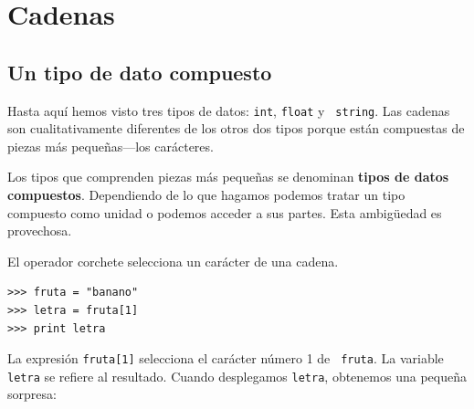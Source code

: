 

\chapter{Cadenas}
\label{strings}


\section{Un tipo de dato compuesto}

Hasta aquí hemos visto tres tipos de datos: \texttt{int}, \texttt{float} y {\tt
string}.  Las cadenas son cualitativamente diferentes de los otros dos 
tipos porque están compuestas de piezas más pequeñas---los carácteres.


Los tipos que comprenden piezas más pequeñas se denominan 
 {\bf tipos de datos compuestos}.  Dependiendo de lo que hagamos
podemos tratar un tipo compuesto como unidad o podemos acceder a 
sus partes. Esta ambigüedad es provechosa.


El operador corchete selecciona un carácter de una cadena.

\beforeverb
\begin{verbatim}
>>> fruta = "banano"
>>> letra = fruta[1]
>>> print letra
\end{verbatim}
\afterverb
%
La expresión \texttt{fruta[1]} selecciona el carácter número 1 de {\tt
fruta}.  La variable \texttt{letra} se refiere al resultado.  Cuando
desplegamos \texttt{letra}, obtenemos una pequeña sorpresa:

